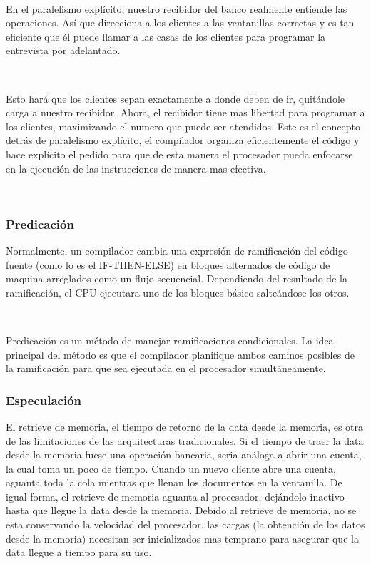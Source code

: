 \documentclass[11pt, conference]{IEEEtran}
\begin{document}
\

En el paralelismo explícito, nuestro recibidor del banco realmente entiende las operaciones. Así que direcciona a los clientes a las ventanillas correctas y es tan eficiente que él puede llamar a las casas de los clientes para programar la entrevista por adelantado.

\

Esto hará que los clientes sepan exactamente a donde deben de ir, quitándole carga a nuestro recibidor. Ahora, el recibidor tiene mas libertad para programar a los clientes, maximizando el numero que puede ser atendidos. Este es el concepto detrás de paralelismo explícito, el compilador organiza eficientemente el código y hace explícito el pedido para que de esta manera el procesador pueda enfocarse en la ejecución de las instrucciones de manera mas efectiva.

\

\subsubsection{Predicación}
Normalmente, un compilador cambia una expresión de ramificación del código fuente (como lo es el IF-THEN-ELSE) en bloques alternados de código de maquina arreglados como un flujo secuencial. Dependiendo del resultado de la ramificación, el CPU ejecutara uno de los bloques básico salteándose los otros.

\

Predicación es un método de manejar ramificaciones condicionales. La idea principal del método es que el compilador planifique ambos caminos posibles de la ramificación para que sea ejecutada en el procesador simultáneamente.

\subsubsection{Especulación}
El retrieve de memoria, el tiempo de retorno de la data desde la memoria, es otra de las limitaciones de las arquitecturas tradicionales. Si el tiempo de traer la data desde la memoria fuese una operación bancaria, seria análoga a abrir una cuenta, la cual toma un poco de tiempo. Cuando un nuevo cliente abre una cuenta, aguanta toda la cola mientras que llenan los documentos en la ventanilla. De igual forma, el retrieve de memoria aguanta al procesador, dejándolo inactivo hasta que llegue la data desde la memoria. Debido al retrieve de memoria, no se esta conservando la velocidad del procesador, las cargas (la obtención de los datos desde la memoria) necesitan ser inicializados mas temprano para asegurar que la data llegue a tiempo para su uso.
\end{document}

